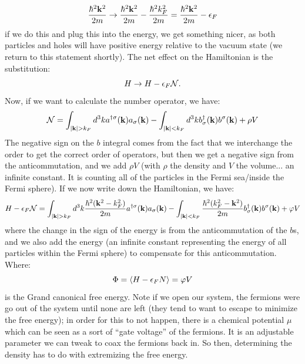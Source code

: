 \begin{equation}
    \frac{\hbar^2\mathbf{k}^2}{2m} \to \frac{\hbar^2\mathbf{k}^2}{2m} - \frac{\hbar^2k_F^2}{2m} = \frac{\hbar^2\mathbf{k}^2}{2m} - \epsilon_F
\end{equation}
if we do this and plug this into the energy, we get something nicer, as both particles and holes will have positive energy relative to the vacuum state (we return to this statement shortly). The net effect on the Hamiltonian is the substitution:
\begin{equation}
    H \to H - \epsilon_F\mathcal{N}.
\end{equation}
Now, if we want to calculate the number operator, we have:
\begin{equation}
    \mathcal{N} = \int_{\lvert \mathbf{k} \rvert > k_F} d^3k a^{\dagger\sigma}(\mathbf{k})a_\sigma(\mathbf{k}) - \int_{\lvert \mathbf{k} \rvert < k_F} d^3k b^\dagger_\sigma(\mathbf{k})b^\sigma(\mathbf{k}) + \rho V
\end{equation}
The negative sign on the $b$ integral comes from the fact that we interchange the order to get the correct order of operators, but then we get a negative sign from the anticommutation, and we add $\rho V$ (with $\rho$ the density and $V$ the volume... an infinite constant. It is counting all of the particles in the Fermi sea/inside the Fermi sphere). If we now write down the Hamiltonian, we have:
\begin{equation}
    H - \e_F \mathcal{N} =  \int_{\abs{\v{k}} > k_F} d^3k \frac{\hbar^2(\v{k}^2 - k_F^2)}{2m}a^{\dag\sigma}(\v{k})a_\sigma(\v{k}) - \int_{\abs{\v{k}} < k_F} \frac{\hbar^2(k_F^2 - \v{k}^2)}{2m}b_\sigma^\dag(\v{k})b^\sigma(\v{k}) + \varphi V
\end{equation}
where the change in the sign of the energy is from the anticommutation of the $b$s, and we also add the energy (an infinite constant representing the energy of all particles within the Fermi sphere) to compensate for this anticommutation. Where:
\begin{equation}
    \Phi = \avg{H - \e_F N} = \varphi V
\end{equation}
is the Grand canonical free energy. Note if we open our system, the fermions were go out of the system until none are left (they tend to want to escape to minimize the free energy); in order for this to not happen, there is a chemical potential $\mu$ which can be seen as a sort of ``gate voltage'' of the fermions. It is an adjustable parameter we can tweak to coax the fermions back in. So then, determining the density has to do with extremizing the free energy.


